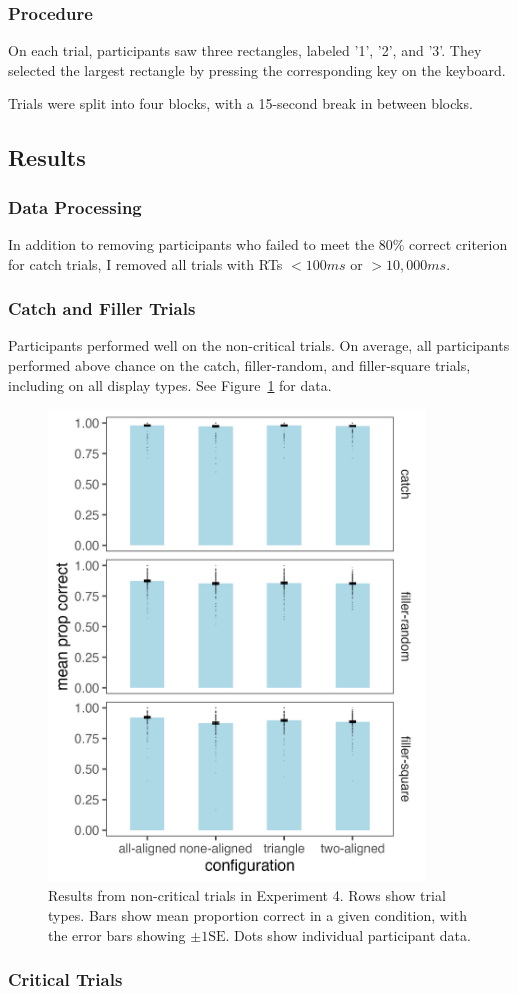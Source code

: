 \subsubsection{Procedure}
On each trial, participants saw three rectangles, labeled '1', '2', and '3'. They selected the largest rectangle by pressing the corresponding key on the keyboard. 

Trials were split into four blocks, with a 15-second break in between blocks.

\subsection{Results}

\subsubsection{Data Processing}
In addition to removing participants who failed to meet the $80\%$ correct criterion for catch trials, I removed all trials with RTs $<100ms$ or $>10,000ms$. 

\subsubsection{Catch and Filler Trials}
Participants performed well on the non-critical trials. On average, all participants performed above chance on the catch, filler-random, and filler-square trials, including on all display types. See Figure~\ref{fig:comparability_non_crit_mean_prop_correct} for data.

\begin{figure}
   \includegraphics[width=100mm]{figures/comparability_non_crit_mean_prop_correct.jpeg}
   \caption{Results from non-critical trials in Experiment 4. Rows show trial types. Bars show mean proportion correct in a given condition, with the error bars showing $\pm1\text{SE}$. Dots show individual participant data.}
   \label{fig:comparability_non_crit_mean_prop_correct}
\end{figure}

\subsubsection{Critical Trials}